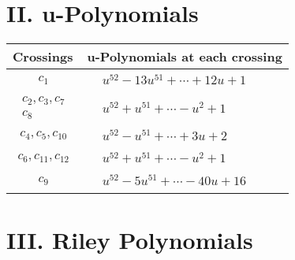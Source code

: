 \documentclass[1p]{elsarticle_modified}
\theoremstyle{definition}
\begin{document}
\newpage\renewcommand{\arraystretch}{1}
\centering \section*{ II. u-Polynomials}
\begin{tabular}{m{50pt}|m{274pt}}
Crossings & \hspace{64pt}u-Polynomials at each crossing \\
\hline $$\begin{aligned}c_{1}\end{aligned}$$&$\begin{aligned}
&u^{52}-13 u^{51}+\cdots+12 u+1
\end{aligned}$\\
\hline $$\begin{aligned}c_{2},c_{3},c_{7}\\c_{8}\end{aligned}$$&$\begin{aligned}
&u^{52}+u^{51}+\cdots- u^2+1
\end{aligned}$\\
\hline $$\begin{aligned}c_{4},c_{5},c_{10}\end{aligned}$$&$\begin{aligned}
&u^{52}- u^{51}+\cdots+3 u+2
\end{aligned}$\\
\hline $$\begin{aligned}c_{6},c_{11},c_{12}\end{aligned}$$&$\begin{aligned}
&u^{52}+u^{51}+\cdots- u^2+1
\end{aligned}$\\
\hline $$\begin{aligned}c_{9}\end{aligned}$$&$\begin{aligned}
&u^{52}-5 u^{51}+\cdots-40 u+16
\end{aligned}$\\
\hline
\end{tabular}\newpage\renewcommand{\arraystretch}{1}
\centering \section*{ III. Riley Polynomials}
\end{document}
